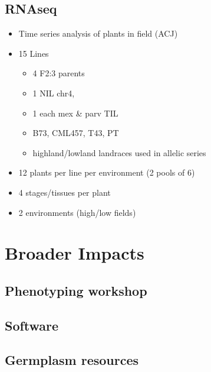 \documentclass[]{article}
\begin{document}
\subsection { RNAseq }
	\begin{itemize}
		\item Time series analysis of plants in field (ACJ)
		\item 15 Lines
			\begin{itemize}
				\item 4 F2:3 parents
				\item 1 NIL chr4, 
				\item 1 each mex \& parv TIL
				\item B73, CML457, T43, PT
				\item highland/lowland landraces used in allelic series
			\end{itemize}
		\item 12 plants per line per environment (2 pools of 6)
		\item 4 stages/tissues per plant
		\item 2 environments (high/low fields)
	\end{itemize}

\section { Broader Impacts }
\subsection { Phenotyping workshop }
\subsection { Software }
\subsection { Germplasm resources }





\end{document}
